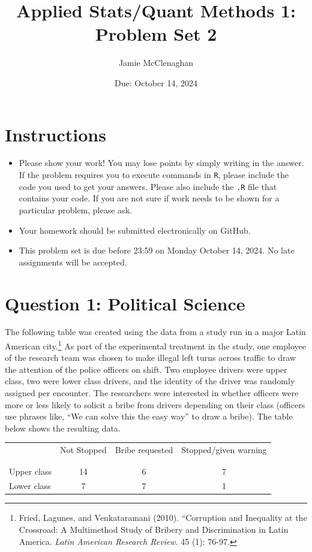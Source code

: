 \documentclass[12pt,letterpaper]{article}
\title{Applied Stats/Quant Methods 1: Problem Set 2}
\date{Due: October 14, 2024}
\author{Jamie McClenaghan}
\begin{document}
	\maketitle
	\section*{Instructions}
\begin{itemize}
	\item Please show your work! You may lose points by simply writing in the answer. If the problem requires you to execute commands in \texttt{R}, please include the code you used to get your answers. Please also include the \texttt{.R} file that contains your code. If you are not sure if work needs to be shown for a particular problem, please ask.
	\item Your homework should be submitted electronically on GitHub.
	\item This problem set is due before 23:59 on Monday October 14, 2024. No late assignments will be accepted.

\end{itemize}

	
	\vspace{.5cm}
	\section*{Question 1: Political Science}
		\vspace{.25cm}
	The following table was created using the data from a study run in a major Latin American city.\footnote{Fried, Lagunes, and Venkataramani (2010). ``Corruption and Inequality at the Crossroad: A Multimethod Study of Bribery and Discrimination in Latin America. \textit{Latin American Research Review}. 45 (1): 76-97.} As part of the experimental treatment in the study, one employee of the research team was chosen to make illegal left turns across traffic to draw the attention of the police officers on shift. Two employee drivers were upper class, two were lower class drivers, and the identity of the driver was randomly assigned per encounter. The researchers were interested in whether officers were more or less likely to solicit a bribe from drivers depending on their class (officers use phrases like, ``We can solve this the easy way'' to draw a bribe). The table below shows the resulting data.

\newpage
\begin{table}[h!]
	\centering
	\begin{tabular}{l | c c c }
		& Not Stopped & Bribe requested & Stopped/given warning \\
		\\[-1.8ex] 
		\hline \\[-1.8ex]
		Upper class & 14 & 6 & 7 \\
		Lower class & 7 & 7 & 1 \\
		\hline
	\end{tabular}
\end{table}
\end{document}
